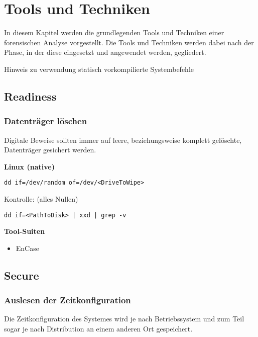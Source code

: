 \chapter{Tools und Techniken} \label{chap:ToolsTechniques}
In diesem Kapitel werden die grundlegenden Tools und Techniken einer forensischen Analyse vorgestellt. Die Tools und Techniken werden dabei nach der Phase, in der diese eingesetzt und angewendet werden, gegliedert.

Hinweis zu verwendung statisch vorkompilierte Systembefehle


\section{Readiness}

\subsection{Datenträger löschen}
Digitale Beweise sollten immer auf leere, beziehungsweise komplett gelöschte, Datenträger gesichert werden.

\textbf{Linux (native)} \\
\begin{verbatim}
dd if=/dev/random of=/dev/<DriveToWipe>
\end{verbatim}

Kontrolle: (alles Nullen)
\begin{verbatim}
dd if=<PathToDisk> | xxd | grep -v
\end{verbatim}
\textbf{Tool-Suiten}\\
\begin{itemize}
\item EnCase
\end{itemize}




\section{Secure}

\subsection{Auslesen der Zeitkonfiguration}
Die Zeitkonfiguration des Systemes wird je nach Betriebssystem und zum Teil sogar je nach Distribution an einem anderen Ort gespeichert.

